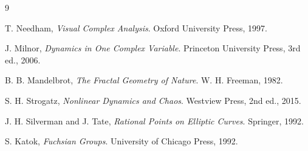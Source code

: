 \documentclass[11pt,a4paper]{article}
\begin{document}
\clearpage
{}
{}
\begin{thebibliography}{9}

T. Needham, \emph{Visual Complex Analysis}. Oxford University Press, 1997.

J. Milnor, \emph{Dynamics in One Complex Variable}. Princeton University Press, 3rd ed., 2006.

B. B. Mandelbrot, \emph{The Fractal Geometry of Nature}. W. H. Freeman, 1982.

S. H. Strogatz, \emph{Nonlinear Dynamics and Chaos}. Westview Press, 2nd ed., 2015.

J. H. Silverman and J. Tate, \emph{Rational Points on Elliptic Curves}. Springer, 1992.

S. Katok, \emph{Fuchsian Groups}. University of Chicago Press, 1992.

\end{thebibliography}
\end{document}

